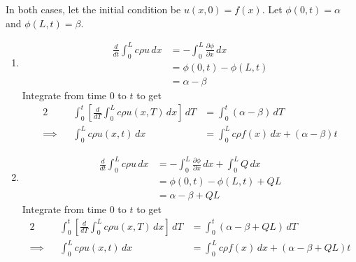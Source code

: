 \documentclass[a4paper]{article}
\begin{document}
In both cases, let the initial condition be \( u \!\left( x,0 \right) = f \!\left( x \right) \). Let \( \phi \!\left( 0,t \right) = \alpha \) and \( \phi \!\left( L,t \right) = \beta \).

\begin{enumerate}[label=(\alph*)]
	\item \begin{align*}
			\frac{d }{dt}\int^{L}_{0} c \rho u \, dx & = -\int^{L}_{0} \frac{\partial \phi}{\partial x} \, dx \\
								 & = \phi \!\left( 0,t \right) - \phi \!\left( L,t \right) \\
								 & = \alpha - \beta
	\end{align*}
	Integrate from time \( 0 \) to \( t \) to get
	\begin{alignat*}{2}
		&& \int^{t}_{0} \!\left[ \frac{d }{dT} \int^{L}_{0} c \rho u \!\left( x,T \right) \, dx \right] \, dT & = \int^{t}_{0} \!\left( \alpha - \beta \right) \, dT \\
		\implies && \int^{L}_{0} c \rho u \!\left( x,t \right) \, dx & = \int^{L}_{0} c \rho f \!\left( x \right) \, dx + \!\left( \alpha - \beta \right)t  
	\end{alignat*}
	\item 
	\begin{align*}
		\frac{d }{dt}\int^{L}_{0} c \rho u \, dx & = -\int^{L}_{0} \frac{\partial \phi}{\partial x} \, dx + \int^{L}_{0} Q \, dx \\
							 & = \phi \!\left( 0,t \right) - \phi \!\left( L,t \right) + QL \\
							 & = \alpha - \beta + QL
	\end{align*}
	Integrate from time \( 0 \) to \( t \) to get
	\begin{alignat*}{2}
		&& \int^{t}_{0} \!\left[ \frac{d }{dT}\int^{L}_{0} c \rho u \!\left( x,T \right) \, dx \right] \, dT & = \int^{t}_{0} \!\left( \alpha - \beta + QL \right) \, dT  \\
		\implies && \int^{L}_{0} c \rho u \!\left( x,t \right) \, dx & = \int^{L}_{0} c \rho f \!\left( x \right) \, dx + \!\left( \alpha - \beta + QL \right)t
	\end{alignat*}
\end{enumerate}

\end{document}
